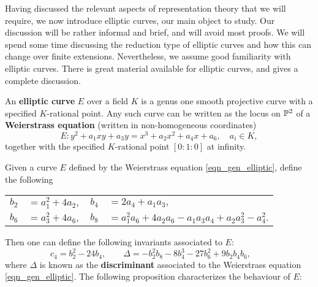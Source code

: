 Having discussed the relevant aspects of representation theory that we will require, we now introduce elliptic curves, our main object to study. Our discussion will be rather informal and brief, and will avoid most proofs. We will spend some time discussing the reduction type of elliptic curves and how this can change over finite extensions. Nevertheless, we assume good familiarity with elliptic curves. There is great material available for elliptic curves, and \cite{S1} gives a complete discussion.

\begin{defn}
An \textbf{elliptic curve} $E$ over a field $K$ is a genus one smooth projective curve with a specified $K$-rational point. Any such curve can be written as the locus on $\mathbb{P}^2$ of a \textbf{Weierstrass equation} (written in non-homogeneous coordinates)
\begin{equation}\label{eqn_gen_elliptic}
    E: y^2+a_1xy+a_3y=x^3+a_2x^2+a_4x+a_6,\quad a_i\in K,
\end{equation}
together with the specified $K$-rational point $[0:1:0]$ at infinity.
\end{defn}
Given a curve $E$ defined by the Weierstrass equation \eqref{eqn_gen_elliptic}, define the following
\begin{table}[H]
	\centering\vspace{-1em}
	\begin{tabular}{l  l  l  l}
		$b_2$ &  $= a_1^2 + 4 a_2,$ & $b_4$ & $=2 a_4 + a_1 a_3,$\\
		$b_6$ & $=a_3^2 + 4 a_6,$ & $b_8$ & $= a_1^2 a_6 + 4 a_2 a_6 - a_1 a_3 a_4 + a_2 a_3^2 - a_4^2.$\\
	\end{tabular}
    \vspace{-1em}
\end{table}
\noindent Then one can define the following invariants associated to $E:$
$$c_4 =b_2^2 - 24 b_4, \qquad \Delta = -b_2^2 b_8 - 8 b_4^3 - 27b_6^2 + 9b_2b_4b_6, \qquad $$
where $\Delta$ is known as the \textbf{discriminant} associated to the Weierstrass equation \eqref{eqn_gen_elliptic}. The following proposition characterizes the behaviour of $E$:
